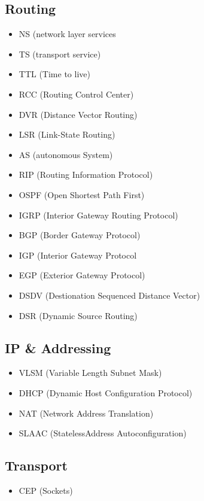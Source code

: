 	\subsection{Routing}
		\begin{itemize}
			\item NS (network layer services
			\item TS (transport service)
			\item TTL (Time to live)
			\item RCC (Routing Control Center)
			\item DVR (Distance Vector Routing)
			\item LSR (Link-State Routing)
			\item AS (autonomous System)
			\item RIP (Routing Information Protocol)
			\item OSPF (Open Shortest Path First)
			\item IGRP (Interior Gateway Routing Protocol)
			\item BGP (Border Gateway Protocol)
			\item IGP (Interior Gateway Protocol
			\item EGP (Exterior Gateway Protocol)
			\item DSDV (Destionation Sequenced Distance Vector)
			\item DSR (Dynamic Source Routing)
		\end{itemize}
	\subsection{IP \& Addressing}
		\begin{itemize}
			\item VLSM (Variable Length Subnet Mask)
			\item DHCP (Dynamic Host Configuration Protocol)
			\item NAT (Network Address Translation)
			\item SLAAC (StatelessAddress Autoconfiguration)
		\end{itemize}
	\subsection{Transport}
		\begin{itemize}
			\item CEP (Sockets)
		\end{itemize}